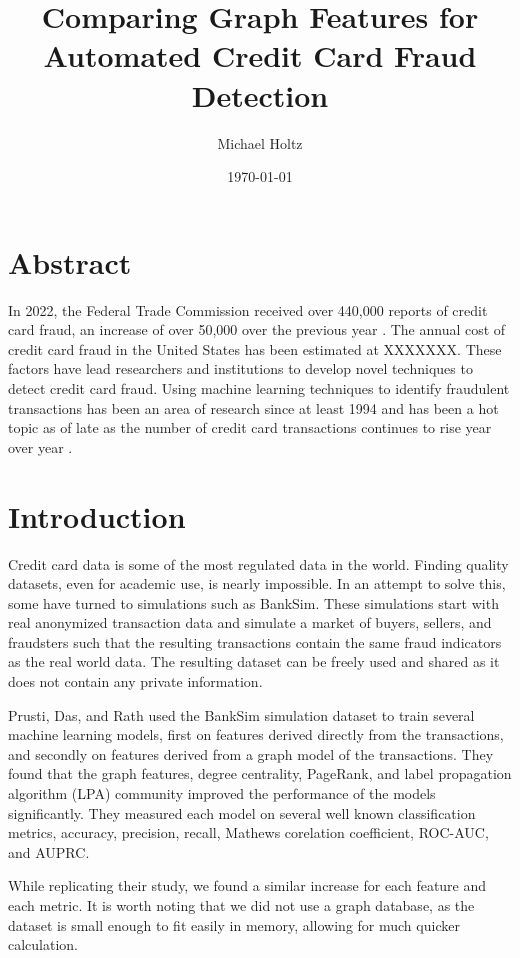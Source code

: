 \documentclass{article}
\title{Comparing Graph Features for Automated Credit Card Fraud Detection}
\author{Michael Holtz}
\date{\today}
\begin{document}
\maketitle

\section{Abstract}
In 2022, the Federal Trade Commission received over 440,000 reports of credit card fraud, an increase of over 50,000 over the previous year \cite{ftc2021,ftc2022}. The annual cost of credit card fraud in the United States has been estimated at XXXXXXX. These factors have lead researchers and institutions to develop novel techniques to detect credit card fraud. Using machine learning techniques to identify fraudulent transactions has been an area of research since at least 1994 and has been a hot topic as of late as the number of credit card transactions continues to rise year over year \cite{1994, Federal_Reserve_2023}. 
\section{Introduction}
Credit card data is some of the most regulated data in the world. Finding quality datasets, even for academic use, is nearly impossible. In an attempt to solve this, some have turned to simulations such as BankSim\cite{Banksim}. These simulations start with real anonymized transaction data and simulate a market of buyers, sellers, and fraudsters such that the resulting transactions contain the same fraud indicators as the real world data. The resulting dataset can be freely used and shared as it does not contain any private information. 

Prusti, Das, and Rath used the BankSim simulation dataset to train several machine learning models, first on features derived directly from the transactions, and secondly on features derived from a graph model of the transactions. They found that the graph features, degree centrality, PageRank, and label propagation algorithm (LPA) community improved the performance of the models significantly. They measured each model on several well known classification metrics, accuracy, precision, recall, Mathews corelation coefficient, ROC-AUC, and AUPRC. 

While replicating their study, we found a similar increase for each feature and each metric. It is worth noting that we did not use a graph database, as the dataset is small enough to fit easily in memory, allowing for much quicker calculation. 
\end{document}
